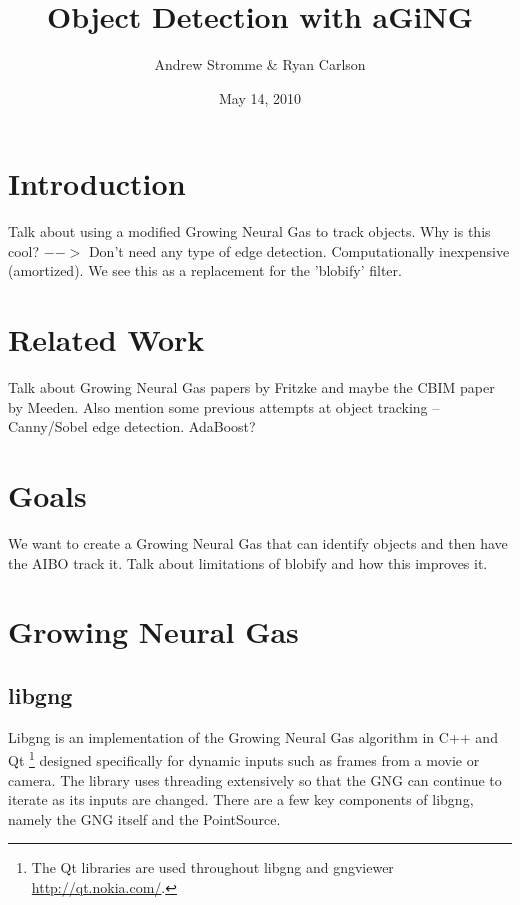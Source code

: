 \documentclass{article}
\renewcommand{\|}{\origbar} %
\begin{document}
\title{Object Detection with aGiNG}
\author{Andrew Stromme \& Ryan Carlson}
\date{May 14, 2010}
\maketitle

\begin{abstract}
\end{abstract}

\section{Introduction}

Talk about using a modified Growing Neural Gas to track objects. Why is this cool? $-->$ Don't need any type of edge detection. Computationally inexpensive (amortized). We see this as a replacement for the 'blobify' filter.

\section{Related Work}

Talk about Growing Neural Gas papers by Fritzke and maybe the CBIM paper by Meeden. Also mention some previous attempts at object tracking -- Canny/Sobel edge detection. AdaBoost?

\section{Goals}

We want to create a Growing Neural Gas that can identify objects and then have the AIBO track it. Talk about limitations of blobify and how this improves it.

\section{Growing Neural Gas}

\subsection{libgng}

Libgng is an implementation of the Growing Neural Gas algorithm in C++ and Qt \footnote{The Qt libraries are used throughout libgng and gngviewer \url{http://qt.nokia.com/}.} designed specifically for dynamic inputs such as frames from a movie or camera. The library uses threading extensively so that the GNG can continue to iterate as its inputs are changed. There are a few key components of libgng, namely the GNG itself and the PointSource.
\end{document}

